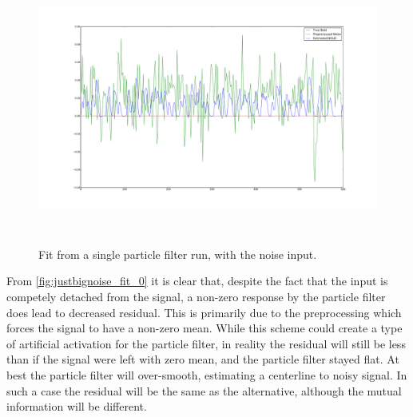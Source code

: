 \begin{figure}[H]
\centering
\includegraphics[clip=true,trim=6cm 3cm 6cm 3cm,height=9cm]{images/justbignoise_fit_0}
\caption{Fit from a single particle filter run, with the noise input. }
\label{fig:justbignoise_fit_0}
\end{figure} %


From \autoref{fig:justbignoise_fit_0} it is clear that, despite the fact that the input 
is competely detached from the signal, a non-zero response by the particle filter does
lead to decreased residual. This is primarily due to the preprocessing which forces the signal to
have a non-zero mean. While this scheme could create a type of artificial activation for
the particle filter, in reality the residual will still be less than if the signal were left
with zero mean, and the particle filter stayed flat. At best the particle filter will 
over-smooth, estimating a centerline to noisy signal. In such a case
the residual will be the same as the alternative, although the mutual information will 
be different.

